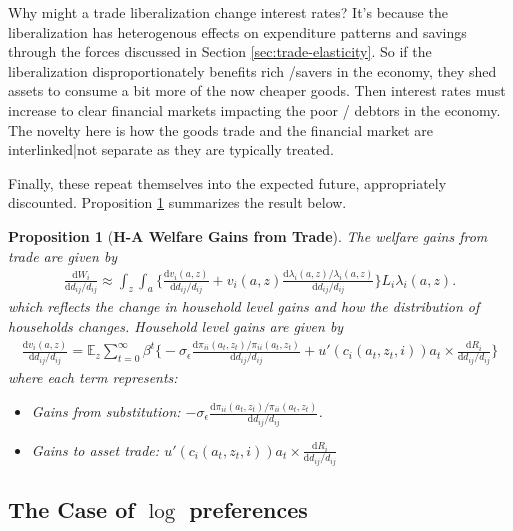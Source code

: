 \documentclass[12pt,pdftex]{article}
\newtheorem{prp}{Proposition}
\begin{document}
\begin{onehalfspacing}
Why might a trade liberalization change interest rates? It's because the liberalization has heterogenous effects on expenditure patterns and savings through the forces discussed in Section \ref{sec:trade-elasticity}. So if the liberalization disproportionately benefits rich /savers in the economy, they shed assets to consume a bit more of the now cheaper goods. Then interest rates must increase to clear financial markets impacting the poor / debtors in the economy. The novelty here is how the goods trade and the financial market are interlinked|not separate as they are typically treated.

Finally, these repeat themselves into the expected future, appropriately discounted. Proposition \ref{prp:gains-trade} summarizes the result below.
\begin{prp}[\textbf{H-A Welfare Gains from Trade}] \label{prp:gains-trade} The welfare gains from trade are given by
{\footnotesize
\begin{align}
\frac{\mathrm{d} W_{i}}{\mathrm{d} d_{ij} / d_{ij}} \approx \int_{z} \int_{a}  \bigg \{ \frac{\mathrm{d} v_i(a, z)}{\mathrm{d} d_{ij} / d_{ij}}  + v_{i}(a,z) \frac{\mathrm{d} \lambda_{i}(a,z)/ \lambda_{i}(a,z)}{\mathrm{d} d_{ij} / d_{ij}}  \bigg \} L_i \lambda_{i}(a,z).
\nonumber
\end{align}
}which reflects the change in household level gains and how the distribution of households changes. Household level gains are given by
{\footnotesize
\begin{align}
\nonumber
\frac{\mathrm{d} v_i(a, z)}{\mathrm{d} d_{ij} / d_{ij}} = \mathbb{E}_{z} \sum_{t = 0}^{\infty} \beta^{t} \bigg \{ -\sigma_{\epsilon} \frac{\mathrm{d} \pi_{ii}(a_{t},z_{t}) / \pi_{ii}(a_{t},z_{t})}{\mathrm{d}d_{ij} / d_{ij}} + u'(c_{i}(a_{t},z_{t},i))a_{t} \times \frac{\mathrm{d} R_{i}}{\mathrm{d} d_{ij} / d_{ij}} \bigg \}
\end{align}
}where each term represents:
\begin{itemize}
\item Gains from substitution: $-\sigma_{\epsilon} \frac{\mathrm{d} \pi_{ii}(a_{t},z_{t}) / \pi_{ii}(a_{t},z_{t})}{\mathrm{d}d_{ij} / d_{ij}}$.

\item Gains to asset trade: $u'(c_{i}(a_{t},z_{t}, i))a_{t} \times \frac{\mathrm{d} R_{i}}{\mathrm{d} d_{ij} / d_{ij}}$
\end{itemize}
\end{prp}

\subsection{The Case of $\log$ preferences}


\end{onehalfspacing}
\end{document}
